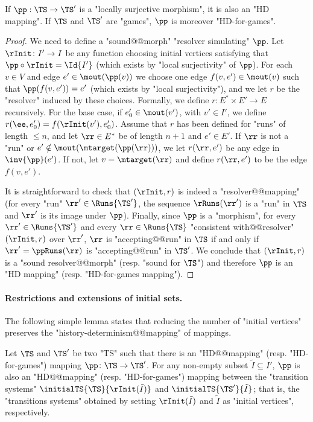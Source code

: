 \documentclass{theoretics}
\begin{document}
\begin{lemma}\label{lemma-morph:loc_surjective_implies_HD}
	If $\pp: \TS \to \TS'$ is a "locally surjective morphism", it is also an "HD mapping". If $\TS$ and $\TS'$ are "games", $\pp$ is moreover "HD-for-games". 
\end{lemma}
\begin{proof}
	We need to define a "sound@@morph" "resolver simulating" $\pp$. Let $\rInit\colon I' \to I$ be any function choosing initial vertices satisfying that $\pp\circ\rInit = \Id{I'}$ (which exists by "local surjectivity" of $\pp$). For each $v\in V$ and edge $e'\in \mout(\pp(v))$ we choose one edge $f(v,e')\in \mout(v)$ such that $\pp(f(v,e')) = e'$ (which exists by "local surjectivity"), and we let $r$ be the "resolver" induced by these choices. Formally, we define $r \colon E^*\times E' \to E$ recursively. For the base case, if $e_0'\in \mout(v')$, with $v'\in I'$, we define $r(\ee, e_0') = f(\rInit(v'), e_0')$. Assume that $r$ has been defined for "runs" of length $\leq n$, and let $\rr\in E^*$ be of length $n+1$ and $e'\in E'$. If $\rr$ is not a "run" or $e'\notin \mout(\mtarget(\pp(\rr)))$, we let $r(\rr,e')$ be any edge in $\inv{\pp}(e')$. If not, let $v = \mtarget(\rr)$ and define $r(\rr,e')$ to be the edge $f(v,e')$.
	
	It is straightforward to check that $(\rInit, r)$ is indeed a "resolver@@mapping"  (for every "run" $\rr'\in \Runs{\TS'}$, the sequence $\rRuns(\rr')$ is a "run" in $\TS$ and $\rr'$ is its image under $\pp$). Finally, since $\pp$ is a "morphism", for every $\rr'\in \Runs{\TS'}$ and every $\rr\in \Runs{\TS}$ "consistent with@@resolver" $(\rInit, r)$ over $\rr'$, $\rr$ is "accepting@@run" in $\TS$ if and only if $\rr' = \ppRuns(\rr)$ is  "accepting@@run" in $\TS'$. We conclude that $(\rInit ,r)$ is a "sound resolver@@morph" (resp. "sound for $\TS$") and therefore $\pp$ is an "HD mapping" (resp. "HD-for-games mapping").
\end{proof}





\paragraph*{Restrictions and extensions of initial sets.}


The following simple lemma states that reducing the number of "initial vertices" preserves the "history-determinism@@mapping" of mappings. 
\begin{lemma}\label{lemma-morph:HD mappings-reducing-initial-vertices}
	Let $\TS$ and $\TS'$ be two "TS" such that there is an "HD@@mapping" (resp. "HD-for-games") mapping $\pp\colon \TS \to \TS'$. %
	For any non-empty subset $\tilde{I} \subseteq I'$, $\pp$ is also an "HD@@mapping" (resp. "HD-for-games") mapping between the "transition systems" $\initialTS{\TS}{\rInit(\tilde{I})}$ and $\initialTS{\TS'}{\tilde{I}}$; that is, the "transitions systems" obtained by setting $\rInit(\tilde{I})$ and $\tilde{I}$ as "initial vertices", respectively.
\end{lemma}
\end{document}
